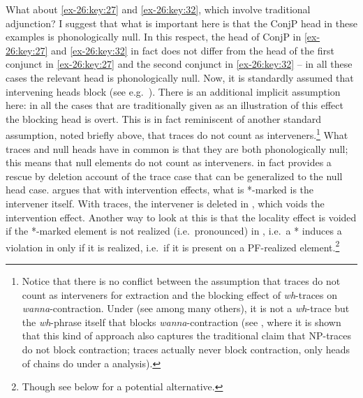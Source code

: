 \documentclass[output=paper]{langsci/langscibook}
\begin{document}
What about \eqref{ex-26:key:27} and \eqref{ex-26:key:32}, which involve traditional adjunction? I suggest that
what is important here is that the ConjP head in these examples is
phonologically null. In this respect, the head of ConjP in \eqref{ex-26:key:27} and \eqref{ex-26:key:32} in
fact does not differ from the head of the first conjunct in \eqref{ex-26:key:27} and the second
conjunct in \eqref{ex-26:key:32} – in all these cases the relevant head is phonologically null.
Now, it is standardly assumed that intervening heads block  (see
e.g.\ \citealt{Roberts2010}). There is an additional implicit assumption here:
in all the cases that are traditionally given as an illustration of this effect
the blocking head is overt. This is in fact reminiscent of another standard
assumption, noted briefly above, that traces do not count as
interveners.\footnote{ Notice that there is no conflict between the assumption
    that traces do not count as interveners for extraction and the blocking
    effect of \emph{wh}-traces on \emph{wanna}-contraction. Under  (see \citealt{Uriagereka1999,Epstein1999,Chomsky2000,Chomsky2001}
    among many others), it is not a \emph{wh}-trace but the \emph{wh}-phrase
    itself that blocks \emph{wanna}-contraction (see \citealt{Boskovic2013c},
    where it is shown that this kind of approach also captures the traditional
    claim that NP-traces do not block contraction; traces actually never block
contraction, only heads of chains do under a  analysis).}
What traces and null heads have in common is that they are both phonologically
null; this means that null elements do not count as interveners.
\textcite{Boskovic2011} in fact provides a rescue by  deletion account of the
trace case that can be generalized to the null head case.
\textcite{Boskovic2011} argues that with intervention effects, what is *-marked
is the intervener itself. With traces, the intervener is deleted in , which
voids the intervention effect.  Another way to look at this is that the
locality effect is voided if the *-marked element is not realized (i.e.\
pronounced) in , i.e.\ a * induces a violation in  only if it is 
realized, i.e.\ if it is present on a PF-realized element.\footnote{Though see
below for a potential alternative.}
\end{document}
